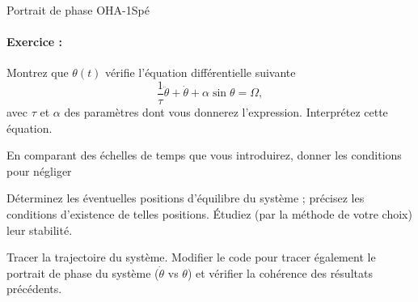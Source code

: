 \begin{exercise}{Portrait de phase OHA}{-1}{Spé}
\begin{center}
\begin{tikzpicture}
    
    
    \end{tikzpicture}
\end{center}


\paragraph{Exercice :}
\begin{questions}
    \question Montrez que $\theta(t)$ vérifie l'équation différentielle suivante
    \begin{equation}
        \dfrac{1}{\tau}\ddot{\theta} + \dot{\theta} + \alpha\sin\theta = \Omega,
    \end{equation}
    avec $\tau$ et $\alpha$ des paramètres dont vous donnerez l'expression. Interprétez cette équation.
    
    \question En comparant des échelles de temps que vous introduirez, donner les conditions pour négliger
    
    \question Déterminez les éventuelles positions d'équilibre du système ; précisez les conditions d'existence de telles positions. Étudiez (par la méthode de votre choix) leur stabilité.
    
    
    \question Tracer la trajectoire du système. Modifier le code pour tracer également le portrait de phase du système ($\dot{\theta}$ vs $\theta$) et vérifier la cohérence des résultats précédents.
    

\end{questions}
\end{exercise}
